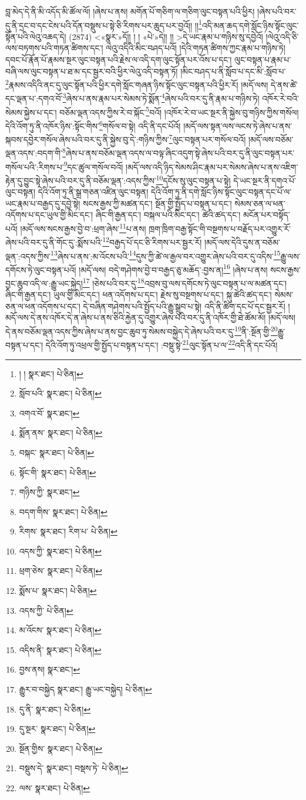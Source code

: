 བླ་མེད་དེ་ནི་མི་འདོད་མི་ཚོལ་ལོ། །ཞེས་པ་ནས། མགོན་པོ་གཅིག་ལ་གཅིག་ལུང་བསྟན་པའི་ཕྱིར། །ཞེས་པའི་བར་དུ་ནི་དྲང་བ་དང་ངེས་པའི་དོན་བསྡུས་པ་སྟེ་ཅི་རིགས་པར་ཆུད་པར་བྱའོ།། །།\footnote{། །  སྣར་ཐང་།  པེ་ཅིན། }འདི་མན་ཆད་དགེ་སློང་ཉིས་སྟོང་ལུང་སྟོན་པའི་ལེའུ་འཆད་དེ། (2874) <«སྣར་»དོ།། །
། «པེ་»དེ།། །། >དེ་ཡང་རྣམ་པ་གཉིས་སུ་དབྱེའོ། །ལེའུ་འདི་ཅི་ལས་བཏགས་པའི་གཏན་ཚིགས་དང་། ལེའུ་འདིའི་མིང་བཤད་པའོ། །དེའི་གཏན་ཚིགས་ཀྱང་རྣམ་པ་གཉིས་ཏེ། དབང་པོ་རྣོན་པོ་རྣམས་སྔར་ལུང་བསྟན་པའི་རྗེས་ལ་འདི་དག་ལུང་སྟོན་པར་འོས་པ་དང་། ལུང་བསྟན་པ་རྣམ་པ་བཞི་ལས་ལུང་བསྟན་པ་ཐ་མ་དང་སྦྱར་བའི་ཕྱིར་ལེའུ་འདི་བསྟན་ཏོ། །མིང་བཤད་པ་ནི་སློབ་པ་དང་མི་:སློབ་པ་\footnote{སློབ་པའི་  སྣར་ཐང་།  པེ་ཅིན། }རྣམས་འདིའི་ནང་དུ་ལུང་སྟོན་པའི་ཕྱིར་དགེ་སློང་གཞན་ཉིས་སྟོང་ལུང་བསྟན་པའི་ཕྱིར་རོ། །མདོ་ལས། དེ་ནས་ཚེ་དང་ལྡན་པ་:དགའ་བོ་\footnote{འགའ་བོ་  སྣར་ཐང་། }ཞེས་པ་ནས་རྣམ་པར་སེམས་ཏེ་སྨོན་\footnote{སྨོན་ནས་  སྣར་ཐང་།  པེ་ཅིན། }ཞེས་པའི་བར་དུ་ནི་རྣམ་པ་གཉིས་ཏེ། འཁོར་རེ་བའི་སེམས་སྐྱེས་པ་དང་། བཅོམ་ལྡན་འདས་ཀྱིས་རེ་བ་སྐོང་\footnote{བསྐང་  སྣར་ཐང་།  པེ་ཅིན། }བའོ། །འཁོར་རེ་བ་ཡང་སྔར་ནི་སྐྱེས་བུ་གཉིས་ཀྱིས་གསོལ། དེའི་འོག་ཏུ་ནི་འཁོར་ཉིས་:སྟོང་གིས་\footnote{སྟོང་གི་  སྣར་ཐང་།  པེ་ཅིན། }གསོལ་བ་སྟེ། འདི་ནི་དང་པོའོ། །མདོ་ལས་སྟན་ལས་ལངས་ཏེ་ཞེས་པ་ནས་སྐབས་དབྱེར་གསོལ་ཞེས་པའི་བར་དུ་ནི་སྐྱེས་བུ་དེ་:གཉིས་ཀྱིས་\footnote{གཉིས་ཀྱི་  སྣར་ཐང་། }ལུང་བསྟན་པར་གསོལ་བའོ། །མདོ་ལས་བཅོམ་ལྡན་འདས་:བདག་གི་\footnote{བདག་གིས་  སྣར་ཐང་།  པེ་ཅིན། }ཞེས་པ་ནས་བཅོམ་ལྡན་འདས་ལ་བལྟ་ཞིང་འདུག་སྟེ་ཞེས་པའི་བར་དུ་ནི་ལུང་བསྟན་པར་གསོལ་པའི་:རིགས་པ་\footnote{རིགས་  སྣར་ཐང་། རིག་པ་  པེ་ཅིན། }དང་ཚུལ་གསོལ་བའོ། །མདོ་ལས་འདི་ཉིད་སེམས་ཤིང་རྣམ་པར་སེམས་ཞེས་པ་ནས་འཇིག་རྟེན་དུ་བྱུང་སྟེ་ཞེས་པའི་བར་དུ་ནི་བཅོམ་ལྡན་:འདས་ཀྱིས་\footnote{འདས་ཀྱི་  སྣར་ཐང་།  པེ་ཅིན། }དངོས་སུ་ལུང་བསྟན་པ་སྟེ། དེ་ཡང་སྔར་ནི་དགའ་པོ་ལུང་བསྟན། དེའི་འོག་ཏུ་ནི་སྒྲ་གཅན་འཛིན་ལུང་བསྟན། དེའི་འོག་ཏུ་ནི་དགེ་སློང་ཉིས་སྟོང་ལུང་བསྟན་དང་པོ་ལ་ཡང་རྣམ་པ་བརྒྱད་དུ་དབྱེ་སྟེ། སངས་རྒྱས་ཀྱི་མཚན་དང་། སྔོན་གྱི་སྤྱོད་པ་བསྟན་པ་དང་། སེམས་ཅན་ལ་ཕན་འདོགས་པ་དང་ཡུལ་གྱི་མིང་དང་། ཞིང་གི་རྒྱན་དང་། བསྐལ་པའི་མིང་དང་། ཚེའི་ཚད་དང་། མངོན་པར་བསྟོད་པའོ། །མདོ་ལས་སངས་རྒྱས་བྱེ་བ་:ཕྲག་ཞེས་\footnote{ཕྲག་ཅེས་  སྣར་ཐང་།  པེ་ཅིན། }པ་ནས། ཁྲག་ཁྲིག་བརྒྱ་སྟོང་གི་བསྔགས་པ་བརྗོད་པར་འགྱུར་རོ་ཞེས་པའི་བར་དུ་ནི་གོང་དུ་:སྨོས་པའི་\footnote{སྨོས་པ་  སྣར་ཐང་།  པེ་ཅིན། }བརྒྱད་པོ་དང་ཅི་རིགས་པར་སྦྱར་རོ། །མདོ་ལས་དེའི་དུས་ན་བཅོམ་ལྡན་:འདས་ཀྱིས་\footnote{འདས་ཀྱི་  པེ་ཅིན། }ཞེས་པ་ནས་:མ་འོངས་པའི་\footnote{མ་འོངས་  སྣར་ཐང་།  པེ་ཅིན། }དུས་ཀྱི་ཚེ་ལ་རྒྱལ་བར་འགྱུར་ཞེས་པའི་བར་དུ་འདིས་\footnote{འདིས་ནི་  སྣར་ཐང་།  པེ་ཅིན། }རྒྱུ་ལས་དགོངས་ཏེ་ལུང་བསྟན་པའོ། །མདོ་ལས། བདེ་གཤེགས་བྱེ་བ་བརྒྱད་ཅུ་མཆོད་:བྱས་ན།\footnote{བྱས་ནས།  སྣར་ཐང་། } །ཞེས་པ་ནས། སངས་རྒྱས་བྱང་ཆུབ་འདི་ལ་:རྒྱུ་ཡང་སྐྱེད།\footnote{རྒྱུར་བ་བསྐྱེད  སྣར་ཐང་། རྒྱུ་ཡང་བསྐྱེད།  པེ་ཅིན། } །ཅེས་པའི་བར་དུ་\footnote{དུ་ནི་  སྣར་ཐང་།  པེ་ཅིན། }འབྲས་བུ་ལས་དགོངས་ཏེ་ལུང་བསྟན་པ་ལ་མཚན་དང་། ཞིང་གི་རྒྱན་དང་། ཡུལ་གྱི་མིང་དང་། ཕན་འདོགས་པ་དང་། རྗེས་སུ་བསྔགས་པ་དང་། སྐུ་ཚེའི་ཚད་དང་། སེམས་ཅན་ལ་ཕན་འདོགས་པ་དང་། དེ་བཞིན་གཤེགས་པའི་སྤྱོད་པའི་རྒྱུ་སྒྲུབ་པ་སྟེ། འདི་ནི་ཚིག་དང་པོ་དང་སྦྱར་རོ། །མདོ་ལས་དེ་ནས་འཁོར་དེ་ན་ཞེས་པ་ནས་ཅིའི་རྐྱེན་དུ་འགྱུར་ཞེས་པའི་བར་དུ་ནི་འཁོར་གྱི་ཐེ་ཚོམ་མོ། །མདོ་ལས། དེ་ནས་བཅོམ་ལྡན་འདས་ཀྱིས་ཞེས་པ་ནས་བྱང་ཆུབ་ཏུ་སེམས་བསྐྱེད་དེ་ཞེས་པའི་བར་དུ་\footnote{དུ་སྔར་  སྣར་ཐང་།  པེ་ཅིན། }ནི་:སྔོན་གྱི་\footnote{སྔོན་གྱིས་  སྣར་ཐང་།  པེ་ཅིན། }རྒྱུ་བསྟན་པ་དང་། དེའི་འོག་ཏུ་འཕྲལ་གྱི་སྤྱོད་པ་བསྟན་པ་དང་། :བསྡུ་སྟེ་\footnote{བསྡུས་དེ་  སྣར་ཐང་། བསྡས་ཏེ་  པེ་ཅིན། }ལུང་སྟོན་པ་ལ་\footnote{ལས་  སྣར་ཐང་།  པེ་ཅིན། }འདི་ནི་དང་པོའོ། 